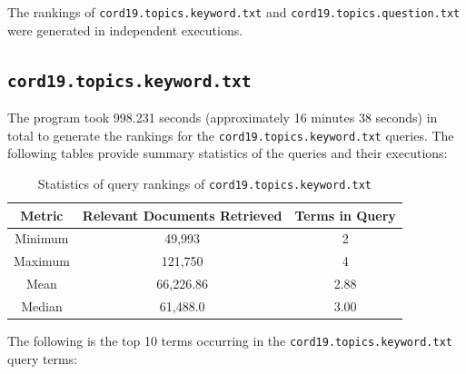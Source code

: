 \documentclass[11pt]{article}
\begin{document}
The rankings of \texttt{cord19.topics.keyword.txt} and \texttt{cord19.topics.question.txt} were generated in independent executions.

\subsection{\texttt{cord19.topics.keyword.txt}}
The program took 998.231 seconds (approximately 16 minutes 38 seconds) in total to generate the rankings for the \texttt{cord19.topics.keyword.txt} queries. The following tables provide summary statistics of the queries and their executions:


\begin{table}[!ht]
    \caption{Statistics of query rankings of \texttt{cord19.topics.keyword.txt}}
    \begin{center}

        \begin{tabular}{| c | c | c |}
        \hline
        \textbf{Metric} & \textbf{Relevant Documents Retrieved} & \textbf{Terms in Query}
        \\ \hline
        Minimum & 49,993 & 2
        \\ \hline
        Maximum & 121,750 & 4
        \\ \hline
        Mean & 66,226.86 & 2.88
        \\ \hline
        Median & 61,488.0 & 3.00
        \\ \hline
        \end{tabular}

    \end{center}

\end{table}

The following is the top 10 terms occurring in the  \texttt{cord19.topics.keyword.txt} query terms:
\end{document}
